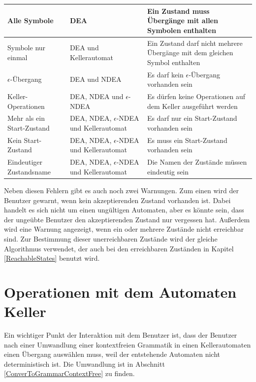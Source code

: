 \noindent
\begin{tabular}{|p{2.1cm}|p{2.7cm}|p{6.0cm}|}
  \hline
  Alle Symbole &
  DEA &
  Ein Zustand muss Übergänge mit allen Symbolen enthalten \\
  \hline
  Symbole nur einmal &
  DEA und Kellerautomat &
  Ein Zustand darf nicht mehrere Übergänge mit dem gleichen Symbol enthalten \\
  \hline
  $\epsilon$-Übergang &
  DEA und NDEA &
  Es darf kein $\epsilon$-Übergang vorhanden sein \\
  \hline
  Keller-Operationen &
  DEA, NDEA und $\epsilon$-NDEA &
  Es dürfen keine Operationen auf dem Keller ausgeführt werden \\
  \hline
  Mehr als ein Start-Zustand &
  DEA, NDEA, $\epsilon$-NDEA und Kellerautomat&
  Es darf nur ein Start-Zustand vorhanden sein \\
  \hline
  Kein Start-Zustand &
  DEA, NDEA, $\epsilon$-NDEA und Kellerautomat&
  Es muss ein Start-Zustand vorhanden sein \\
  \hline
  Eindeutiger Zustandsname &
  DEA, NDEA, $\epsilon$-NDEA und Kellerautomat&
  Die Namen der Zustände müssen eindeutig sein \\
  \hline
\end{tabular}
\vspace{10pt}

\noindent
Neben diesen Fehlern gibt es auch noch zwei Warnungen. Zum einen wird der
Benutzer gewarnt, wenn kein akzeptierenden Zustand vorhanden ist. Dabei handelt
es sich nicht um einen ungültigen Automaten, aber es könnte sein, dass der
ungeübte Benutzer den akzeptierenden Zustand nur vergessen hat. Außerdem wird
eine Warnung angezeigt, wenn ein oder mehrere Zustände nicht erreichbar sind.
Zur Bestimmung dieser unerreichbaren Zustände wird der gleiche Algorithmus
verwendet, der auch bei den erreichbaren Zuständen in Kapitel
\ref{ReachableStates} benutzt wird.\vspace{10pt}


\section{Operationen mit dem Automaten Keller}\label{InteractionPDA}

Ein wichtiger Punkt der Interaktion mit dem Benutzer ist, dass der Benutzer
nach einer Umwandlung einer kontextfreien Grammatik in einen Kellerautomaten
einen Übergang auswählen muss, weil der entstehende Automaten nicht
deterministisch ist. Die Umwandlung ist in Abschnitt
\ref{ConverToGrammarContextFree} zu finden.\vspace{10pt}

